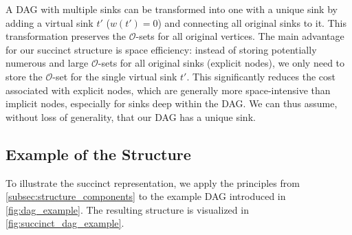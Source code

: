 \begin{remark}
    A DAG with multiple sinks can be transformed into one with a unique sink by adding a virtual sink $t'$ ($w(t')=0$) and connecting all original sinks to it. This transformation preserves the $\mathcal{O}$-sets for all original vertices. The main advantage for our succinct structure is space efficiency: instead of storing potentially numerous and large $\mathcal{O}$-sets for all original sinks (explicit nodes), we only need to store the $\mathcal{O}$-set for the single virtual sink $t'$. This significantly reduces the cost associated with explicit nodes, which are generally more space-intensive than implicit nodes, especially for sinks deep within the DAG. We can thus assume, without loss of generality, that our DAG has a unique sink.
\end{remark}


\subsection*{Example of the Structure}
\label{subsec:structure_example}
To illustrate the succinct representation, we apply the principles from \autoref{subsec:structure_components} to the example DAG introduced in \autoref{fig:dag_example}. The resulting structure is visualized in \autoref{fig:succinct_dag_example}.

